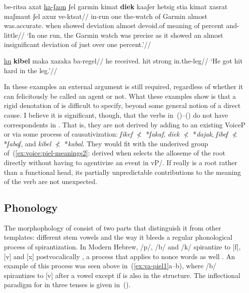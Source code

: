 {  \a \begingl
    \gla be-ritsa axat \underline{ha-ʃaon} ʃel garmin kimat \textbf{diek} kaaʃer hetsig stia kimat xasrat maʃmaut ʃel axuz ve-ktsat//
    \glb in-run one the-watch of Garmin almost was.accurate. when showed deviation almost devoid.of meaning of percent and-little//
    \glft `In one run, the Garmin watch was precise as it showed an almost insignificant deviation of just over one percent.'//
  \endgl
\xe

\ex \begingl
  \gla \underline{hu} \textbf{kibel} maka xazaka ba-regel//
  \glb he received. hit strong in.the-leg//
  \glft `He got hit hard in the leg.'//
  \endgl
\xe

In these examples an external argument is still required, regardless of whether it can felicitously be called an agent or not. What these examples show is that a rigid denotation of {\va} is difficult to specify, beyond some general notion of a direct cause. I believe it is significant, though, that the verbs in~(\blastx)--(\lastx) do not have correspondents in {\tkal}. That is, they are not derived by adding {\va} to an existing VoiceP or via some process of causativization: \emph{ʃikef} $\nless$ *\emph{ʃakaf}, \emph{diek} $\nless$ *\emph{dajak}, \emph{ʃibeʃ} $\nless$ *\emph{ʃabaʃ}, and \emph{kibel} $\nless$ *\emph{kabal}. They would fit with the underived group of~(\ref{ex:voice:piel-meanings2}: derived when {\va} selects the alloseme of the root directly without having to agentivize an event in vP/{\tkal}. If {\va} really is a root rather than a functional head, its partially unpredictable contributions to the meaning of the verb are not unexpected.

	\subsection{Phonology} \label{voice:va:phono}
The morphophology of {\tpie} consist of two parts that distinguish it from other templates: different stem vowels and the way it bleeds a regular phonological process of spirantization. In Modern Hebrew, /p/, /b/ and /k/ spirantize to [f], [v] and [x] postvocalically \citep{adam02,temkinmartinez08wccfl,gouskova12nllt}, a process that applies to nonce words as well \citep{temkinmartinzemuellner16}. An example of this process was seen above in~(\ref{ex:va-piel1}a--b), where /b/ spirantizes to [v] after a vowel except if {\va} is also in the structure. The inflectional paradigm for {\tpie} in three tenses is given in~(\nextx).

}
